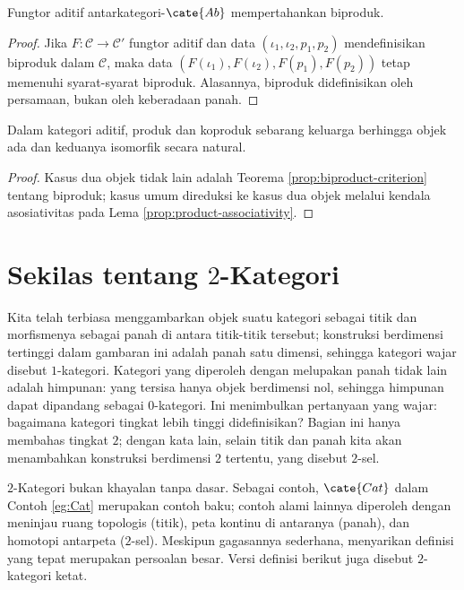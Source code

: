 \begin{proposition}\label{prop:biproduct-preservation}
	Fungtor aditif antarkategori-$\cate{Ab}$ mempertahankan biproduk.
\end{proposition}
\begin{proof}
	Jika $F: \mathcal{C} \to \mathcal{C}'$ fungtor aditif dan data $(\iota_1, \iota_2, p_1, p_2)$ mendefinisikan biproduk dalam $\mathcal{C}$, maka data $(F(\iota_1), F(\iota_2), F(p_1), F(p_2))$ tetap memenuhi syarat-syarat biproduk. Alasannya, biproduk didefinisikan oleh persamaan, bukan oleh keberadaan panah.
\end{proof}

\begin{proposition}\label{prop:additive-prod-coprod}
	Dalam kategori aditif, produk dan koproduk sebarang keluarga berhingga objek ada dan keduanya isomorfik secara natural.
\end{proposition}
\begin{proof}
	Kasus dua objek tidak lain adalah Teorema \ref{prop:biproduct-criterion} tentang biproduk; kasus umum direduksi ke kasus dua objek melalui kendala asosiativitas pada Lema \ref{prop:product-associativity}.
\end{proof}

\section{Sekilas tentang \texorpdfstring{$2$}{2}-Kategori}\label{sec:2-cat}
Kita telah terbiasa menggambarkan objek suatu kategori sebagai titik dan morfismenya sebagai panah di antara titik-titik tersebut; konstruksi berdimensi tertinggi dalam gambaran ini adalah panah satu dimensi, sehingga kategori wajar disebut $1$-kategori. Kategori yang diperoleh dengan melupakan panah tidak lain adalah himpunan: yang tersisa hanya objek berdimensi nol, sehingga himpunan dapat dipandang sebagai $0$-kategori. Ini menimbulkan pertanyaan yang wajar: bagaimana kategori tingkat lebih tinggi didefinisikan? Bagian ini hanya membahas tingkat $2$; dengan kata lain, selain titik dan panah kita akan menambahkan konstruksi berdimensi $2$ tertentu, yang disebut $2$-sel.

$2$-Kategori bukan khayalan tanpa dasar. Sebagai contoh, $\cate{Cat}$ dalam Contoh \ref{eg:Cat} merupakan contoh baku; contoh alami lainnya diperoleh dengan meninjau ruang topologis (titik), peta kontinu di antaranya (panah), dan homotopi antarpeta ($2$-sel). Meskipun gagasannya sederhana, menyarikan definisi yang tepat merupakan persoalan besar. Versi definisi berikut juga disebut $2$-kategori ketat.

